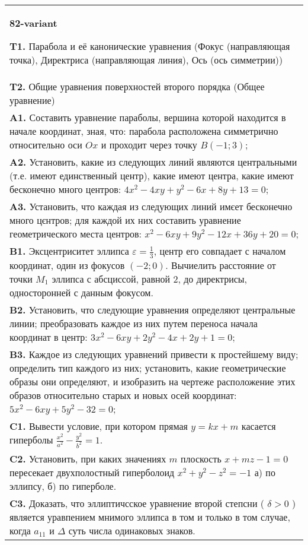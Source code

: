 \documentclass{article}
\begin{document}
\begin{tabular}{m{17cm}}
\textbf{82-variant}
\newline

\textbf{T1.} Парабола и её канонические уравнения (Фокус (направляющая точка), Директриса (направляющая линия), Ось (ось симметрии)) \\
\textbf{T2.} Общие уравнения поверхностей второго порядка (Общее уравнение) \\
\textbf{A1.} Составить уравнение параболы, вершина которой находится в начале координат, зная, что: парабола расположена симметрично относительно оси $O x$ и проходит через точку $B(-1 ; 3)$; \\
\textbf{A2.} Установить, какие из следующих линий являются центральными (т.е. имеют единственный центр), какие имеют центра, какие имеют бесконечно много центров: $4 x^2-4 x y+y^2-6 x+8 y+13=0$; \\
\textbf{A3.} Установить, что каждая из следующих линий имєет бесконечно много цєнтров; для каждой их них составить уравнение геометрического места центров: $x^2-6 x y+9 y^2-12 x+36 y+20=0$; \\
\textbf{B1.} Эксцентриситет эллипса $\varepsilon=\frac{1}{3}$, центр его совпадает с началом координат, один из фокусов $(-2 ; 0)$. Вычиелить расстояние от точки $M_1$ эллипса с абсциссой, равной 2, до директрисы, односторонней с данным фокусом. \\
\textbf{B2.} Установить, что следующие уравнения определяют центральные линии; преобразовать каждое из них путем переноса начала координат в центр: $3 x^2-6 x y+2 y^2-4 x+2 y+1=0$; \\
\textbf{B3.} Каждое из следующих уравнений привести к простейшему виду; определить тип каждого из них; установить, какие геометрические образы они определяют, и изобразить на чертеже расположение этих образов относительно старых и новых осей координат: $5 x^2-6 x y+5 y^2-32=0$; \\
\textbf{C1.} Вывести условие, при котором прямая $y=k x+m$ касается гиперболы $\frac{x^2}{a^2}-\frac{y^2}{b^2}=1$. \\
\textbf{C2.} Установить, при каких значениях $m$ плоскость $x+m z-1=0$ пересекает двухполостный гиперболоид $x^2+y^2-z^2=-1$ а) по эллипсу, б) по гиперболе. \\
\textbf{C3.} Доказать, что эллиптичсское уравнение второй степсни ( $\delta>0$ ) является уравпением мнимого эллипса в том и только в том случае, когда $a_{11}$ и $\Delta$ суть числа одинаковых знаков. \\

\end{tabular}
\vspace{1cm}
\end{document}
